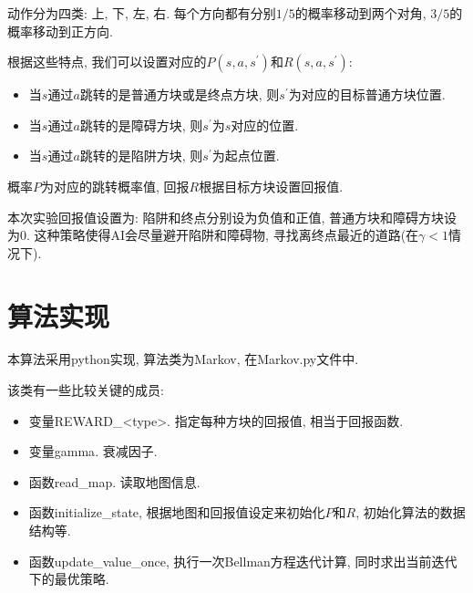 \documentclass{acm_proc_article-sp}
\begin{document}
动作分为四类: 上, 下, 左, 右. 每个方向都有分别$1/5$的概率移动到两个对角, $3/5$的概率移动到正方向.

根据这些特点, 我们可以设置对应的$P(s, a, s^\prime)$和$R(s, a, s^\prime)$:
\begin{itemize}
    \item 当$s$通过$a$跳转的是普通方块或是终点方块, 则$s^\prime$为对应的目标普通方块位置.
    \item 当$s$通过$a$跳转的是障碍方块, 则$s^\prime$为$s$对应的位置.
    \item 当$s$通过$a$跳转的是陷阱方块, 则$s^\prime$为起点位置.
\end{itemize}
概率$P$为对应的跳转概率值, 回报$R$根据目标方块设置回报值.

本次实验回报值设置为: 陷阱和终点分别设为负值和正值, 普通方块和障碍方块设为0. 
这种策略使得AI会尽量避开陷阱和障碍物, 寻找离终点最近的道路(在$\gamma < 1$情况下).

\section{算法实现}

本算法采用python实现, 算法类为Markov, 在\textsf{Markov.py}文件中.

该类有一些比较关键的成员:
\begin{itemize}
    \item 变量\textsf{REWARD\_<type>}. 指定每种方块的回报值, 相当于回报函数.
    \item 变量\textsf{gamma}. 衰减因子.
    \item 函数\textsf{read\_map}. 读取地图信息.
    \item 函数\textsf{initialize\_state}, 根据地图和回报值设定来初始化$P$和$R$, 初始化算法的数据结构等.
    \item 函数\textsf{update\_value\_once}, 执行一次Bellman方程迭代计算, 同时求出当前迭代下的最优策略.
\end{itemize}
\end{document}
